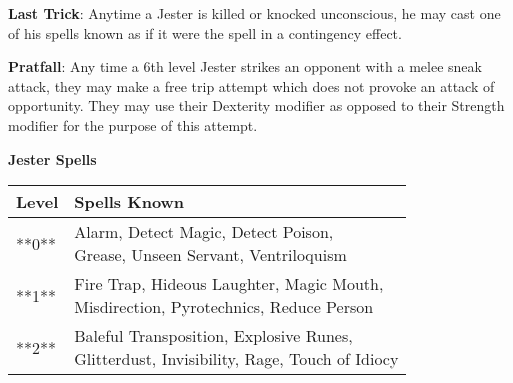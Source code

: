 \textbf{Last Trick}: Anytime a Jester is killed or knocked unconscious, he may cast one of his spells known as if it were the spell in a contingency effect.

\textbf{Pratfall}: Any time a 6th level Jester strikes an opponent with a melee sneak attack, they may make a free trip attempt which does not provoke an attack of opportunity. They may use their Dexterity modifier as opposed to their Strength modifier for the purpose of this attempt.

\textbf{\large{Jester Spells}}

\begin{center}
\begin{adjustwidth}{-4cm}{}
\begin{small}
\begin{tabular}{| l | l |}
\hline
Level &Spells Known \\
\hline
**0** &\makecell{Alarm, Detect Magic, Detect Poison,\\ Grease, Unseen Servant, Ventriloquism} \\
**1** &\makecell{Fire Trap, Hideous Laughter, Magic Mouth,\\ Misdirection, Pyrotechnics, Reduce Person} \\
**2** &\makecell{Baleful Transposition, Explosive Runes,\\ Glitterdust, Invisibility, Rage, Touch of Idiocy} \\
\hline
\end{tabular}
\end{small}
\end{adjustwidth}
\end{center}
